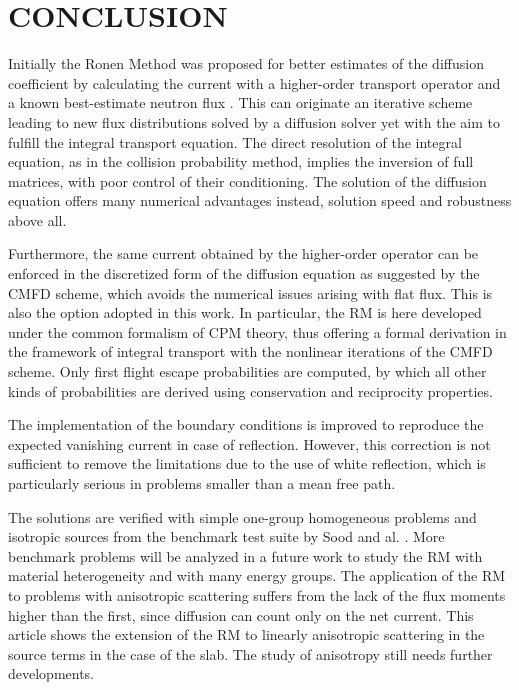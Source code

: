 \documentclass{ictt26}
\begin{document}
\section{CONCLUSION}
\label{sec:cncls}

Initially the Ronen Method was proposed for better estimates of the diffusion coefficient by calculating the current with a higher-order transport operator and a known best-estimate neutron flux \cite{ronen2004accurate}. This can originate an iterative scheme leading to new flux distributions solved by a diffusion solver yet with the aim to fulfill the integral transport equation. The direct resolution of the integral equation, as in the collision probability method, implies the inversion of full matrices, with poor control of their conditioning. The solution of the diffusion equation offers many numerical advantages instead, solution speed and robustness above all.

Furthermore, the same current obtained by the higher-order operator can be enforced in the discretized form of the diffusion equation as suggested by the CMFD scheme, which avoids the numerical issues arising with flat flux. This is also the option adopted in this work. In particular, the RM is here developed under the common formalism of CPM theory, thus offering a formal derivation in the framework of integral transport with the nonlinear iterations of the CMFD scheme. Only first flight escape probabilities are computed, by which all other kinds of probabilities are derived using conservation and reciprocity properties.

The implementation of the boundary conditions is improved to reproduce the expected vanishing current in case of reflection. However, this correction is not sufficient to remove the limitations due to the use of white reflection, which is particularly serious in problems smaller than a mean free path.

The solutions are verified with simple one-group homogeneous problems and isotropic sources from the benchmark test suite by Sood and al. \cite{sood2003analytical}. More benchmark problems will be analyzed in a future work to study the RM with material heterogeneity and with many energy groups. The application of the RM to problems with anisotropic scattering suffers from the lack of the flux moments higher than the first, since diffusion can count only on the net current. This article shows the extension of the RM to linearly anisotropic scattering in the source terms in the case of the slab. The study of anisotropy still needs further developments.
\end{document}
